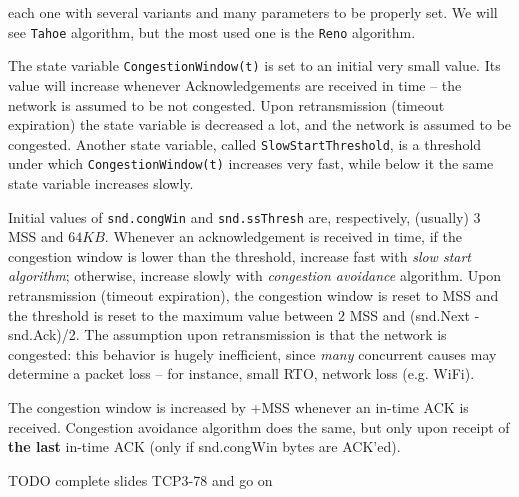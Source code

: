 \documentclass[a4paper, 11pt]{report}
\begin{document}
each one with several variants and many parameters to be properly set. We will
see \texttt{Tahoe} algorithm, but the most used one is the \texttt{Reno}
algorithm.

The state variable \texttt{CongestionWindow(t)} is set to an initial very small
value. Its value will increase whenever Acknowledgements are received in time
\--- the network is assumed to be not congested. Upon retransmission (timeout
expiration) the state variable is decreased a lot, and the network is assumed
to be congested. Another state variable, called \texttt{SlowStartThreshold}, is
a threshold under which \texttt{CongestionWindow(t)} increases very fast, while
below it the same state variable increases slowly.

Initial values of \texttt{snd.congWin} and \texttt{snd.ssThresh} are,
respectively, (usually) $3$ MSS and $64KB$. Whenever an acknowledgement is
received in time, if the congestion window is lower than the threshold,
increase fast with \emph{slow start algorithm}; otherwise, increase slowly with
\emph{congestion avoidance} algorithm. Upon retransmission (timeout
expiration), the congestion window is reset to MSS and the threshold is reset
to the maximum value between $2$ MSS and (snd.Next - snd.Ack)/2. The assumption
upon retransmission is that the network is congested: this behavior is hugely
inefficient, since \emph{many} concurrent causes may determine a packet loss
\--- for instance, small RTO, network loss (e.g. WiFi).

The congestion window is increased by +MSS whenever an in-time ACK is received.
Congestion avoidance algorithm does the same, but only upon receipt of
\textbf{the last} in-time ACK (only if snd.congWin bytes are ACK'ed).

TODO complete slides TCP3-78 and go on
\end{document}
